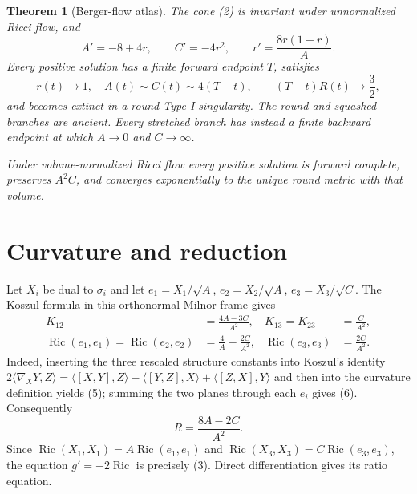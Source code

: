 \documentclass[10pt]{article}
\newtheorem{theorem}{Theorem}
\theoremstyle{remark}
\newcommand{\Ric}{\operatorname{Ric}}
\begin{document}
\begin{theorem}[Berger-flow atlas]\label{thm:atlas}
The cone (2) is invariant under unnormalized Ricci flow, and
\begin{equation}
 A'=-8+4r,\qquad C'=-4r^2,
 \qquad r'=\frac{8r(1-r)}{A}.                       \label{eq:flow}
\end{equation}
Every positive solution has a finite forward endpoint $T$, satisfies
\begin{equation}
 r(t)\longrightarrow1,\hspace{1em}
 A(t)\sim C(t)\sim4(T-t),\qquad
 (T-t)R(t)\longrightarrow\frac32,                 \label{eq:asymptotic}
\end{equation}
and becomes extinct in a round Type-I singularity.  The round and squashed
branches are ancient.  Every stretched branch has instead a finite backward
endpoint at which $A\to0$ and $C\to\infty$.

Under volume-normalized Ricci flow every positive solution is forward
complete, preserves $A^2C$, and converges exponentially to the unique round
metric with that volume.
\end{theorem}

\section{Curvature and reduction}

Let $X_i$ be dual to $\sigma_i$ and let
$e_1=X_1/\sqrt A$, $e_2=X_2/\sqrt A$, $e_3=X_3/\sqrt C$.
The Koszul formula in this orthonormal Milnor frame gives
\begin{align}
 K_{12}&=\frac{4A-3C}{A^2}, &
 K_{13}=K_{23}&=\frac{C}{A^2},                       \label{eq:sectional}\\
 \Ric(e_1,e_1)=\Ric(e_2,e_2)&=\frac4A-\frac{2C}{A^2}, &
 \Ric(e_3,e_3)&=\frac{2C}{A^2}.                    \label{eq:ricci}
\end{align}
Indeed, inserting the three rescaled structure constants into Koszul's
identity $2\langle\nabla_XY,Z\rangle=\langle[X,Y],Z\rangle-
\langle[Y,Z],X\rangle+\langle[Z,X],Y\rangle$ and then into the curvature
definition yields (5); summing the two planes through each $e_i$ gives (6).
Consequently
\begin{equation}
 R=\frac{8A-2C}{A^2}.                               \label{eq:scalar}
\end{equation}
Since $\Ric(X_1,X_1)=A\Ric(e_1,e_1)$ and
$\Ric(X_3,X_3)=C\Ric(e_3,e_3)$, the equation $g'=-2\Ric$
is precisely (3).  Direct differentiation gives its ratio equation.
\end{document}
